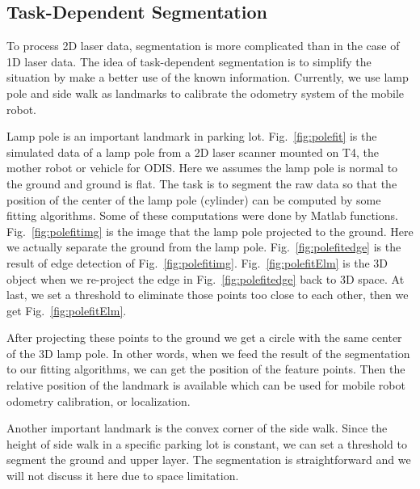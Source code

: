 \documentclass{cdcarta4}
\begin{document}
\subsection{Task-Dependent Segmentation}
\label{sec24}


To process 2D laser data, segmentation is more complicated than in the case of 1D laser data. The idea of task-dependent segmentation is to simplify the situation by make a better use of the known information. Currently, we use lamp pole and side walk as landmarks to calibrate the odometry system of the mobile robot.

Lamp pole is an important landmark in parking lot. Fig.~\ref{fig:polefit} is the simulated 
data of a lamp pole from a 2D laser scanner mounted on T4, the mother robot or vehicle for ODIS. Here we assumes the lamp pole is normal to the ground and ground is flat. The task is to segment the raw data so
that the position of the center of the lamp pole (cylinder) can be computed by some fitting algorithms. Some of these computations were done by Matlab functions. Fig.~\ref{fig:polefitimg} is the image that the lamp pole projected to the ground. Here we actually separate the ground from the lamp pole. Fig.~\ref{fig:polefitedge} is the result of edge detection of Fig.~\ref{fig:polefitimg}. Fig.~\ref{fig:polefitElm} is the 3D object when we re-project   the edge in Fig.~\ref{fig:polefitedge} back to 3D space. At last, we set a threshold to eliminate those points too close to each other, then we get Fig.~\ref{fig:polefitElm}. 

After projecting these points to the ground we get a circle with the same center of the 3D lamp pole. In other words, when we feed the result of the segmentation to our fitting algorithms, we can get the position of the feature points. Then the relative position of the landmark is available which can be used for mobile robot odometry calibration, or localization. 

Another important landmark is the convex corner of the side walk. Since the height of side walk in a specific parking lot is constant, we can set a threshold to segment the ground and upper layer. The segmentation is straightforward and  we will not discuss it here due to space limitation. 
\end{document}
